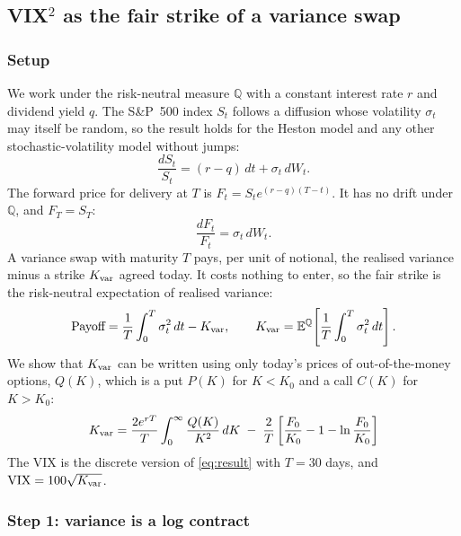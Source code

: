 
\subsection{VIX$^2$ as the fair strike of a variance swap}
\subsubsection{Setup}

We work under the risk-neutral measure $\mathbb{Q}$ with a constant interest rate $r$ and dividend yield $q$. The S\&P~500 index $S_t$ follows a diffusion whose volatility $\sigma_t$ may itself be random, so the result holds for the Heston model and any other stochastic-volatility model without jumps:
\begin{equation}
  \frac{dS_t}{S_t} = (r-q)\,dt + \sigma_t\,dW_t .
\end{equation}
The forward price for delivery at $T$ is $F_t = S_t e^{(r-q)(T-t)}$. It has no drift under $\mathbb{Q}$, and $F_T = S_T$:
\begin{equation}
  \frac{dF_t}{F_t} = \sigma_t\,dW_t .
  \label{eq:fwd}
\end{equation}
A variance swap with maturity $T$ pays, per unit of notional, the realised variance minus a strike $K_{\mathrm{var}}$ agreed today. It costs nothing to enter, so the fair strike is the risk-neutral expectation of realised variance:
\begin{equation}
  \text{Payoff} = \frac{1}{T}\int_0^T \sigma_t^2\,dt - K_{\mathrm{var}},
  \qquad
  K_{\mathrm{var}} = \mathbb{E}^{\mathbb{Q}}\!\left[\frac{1}{T}\int_0^T \sigma_t^2\,dt\right].
\end{equation}
We show that $K_{\mathrm{var}}$ can be written using only today's prices of out-of-the-money options, $Q(K)$, which is a put $P(K)$ for $K<K_0$ and a call $C(K)$ for $K>K_0$:
\begin{equation}
  K_{\mathrm{var}} = \frac{2e^{rT}}{T}\int_0^{\infty}\frac{Q(K)}{K^2}\,dK
  \;-\; \frac{2}{T}\left[\frac{F_0}{K_0}-1-\ln\frac{F_0}{K_0}\right]
  \label{eq:result}
\end{equation}
The VIX is the discrete version of \eqref{eq:result} with $T=30$ days, and $\mathrm{VIX} = 100\sqrt{K_{\mathrm{var}}}$.

\subsubsection{Step 1: variance is a log contract}

